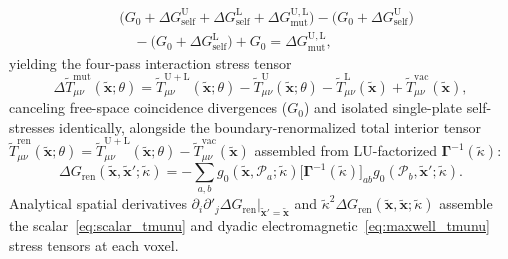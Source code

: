 \documentclass[aps,prd,twocolumn,10pt,showkeys,nofootinbib,floatfix,longbibliography]{revtex4-2}
\begin{document}
\begin{align*}
&\bigl(G_0 + \Delta G_{\mathrm{self}}^{\mathrm{U}} + \Delta G_{\mathrm{self}}^{\mathrm{L}} + \Delta G_{\mathrm{mut}}^{\mathrm{U,L}}\bigr) - \bigl(G_0 + \Delta G_{\mathrm{self}}^{\mathrm{U}}\bigr) \\
&\quad - \bigl(G_0 + \Delta G_{\mathrm{self}}^{\mathrm{L}}\bigr) + G_0 = \Delta G_{\mathrm{mut}}^{\mathrm{U,L}},
\end{align*}
yielding the four-pass interaction stress tensor
\begin{equation}
\Delta \tilde{T}_{\mu\nu}^{\mathrm{mut}}(\tilde{\mathbf{x}}; \theta) = \tilde{T}_{\mu\nu}^{\mathrm{U+L}}(\tilde{\mathbf{x}}; \theta) - \tilde{T}_{\mu\nu}^{\mathrm{U}}(\tilde{\mathbf{x}}; \theta) - \tilde{T}_{\mu\nu}^{\mathrm{L}}(\tilde{\mathbf{x}}) + \tilde{T}_{\mu\nu}^{\mathrm{vac}}(\tilde{\mathbf{x}}),
\label{eq:four_pass_correlator}
\end{equation}
canceling free-space coincidence divergences ($G_0$) and isolated single-plate self-stresses identically, alongside the boundary-renormalized total interior tensor $\tilde{T}_{\mu\nu}^{\mathrm{ren}}(\tilde{\mathbf{x}}; \theta) = \tilde{T}_{\mu\nu}^{\mathrm{U+L}}(\tilde{\mathbf{x}}; \theta) - \tilde{T}_{\mu\nu}^{\mathrm{vac}}(\tilde{\mathbf{x}})$ assembled from LU-factorized $\mathbf{\Gamma}^{-1}(\tilde{\kappa})$:
\begin{equation}
\Delta G_{\mathrm{ren}}(\tilde{\mathbf{x}}, \tilde{\mathbf{x}}'; \tilde{\kappa}) = -\sum_{a,b} g_0(\tilde{\mathbf{x}}, \mathcal{P}_a; \tilde{\kappa}) \bigl[\mathbf{\Gamma}^{-1}(\tilde{\kappa})\bigr]_{ab} g_0(\mathcal{P}_b, \tilde{\mathbf{x}}'; \tilde{\kappa}).
\label{eq:scattered_greens_pointwise}
\end{equation}
Analytical spatial derivatives $\partial_i \partial'_j \Delta G_{\mathrm{ren}}|_{\tilde{\mathbf{x}}'=\tilde{\mathbf{x}}}$ and $\tilde{\kappa}^2 \Delta G_{\mathrm{ren}}(\tilde{\mathbf{x}}, \tilde{\mathbf{x}}; \tilde{\kappa})$ assemble the scalar~\eqref{eq:scalar_tmunu} and dyadic electromagnetic~\eqref{eq:maxwell_tmunu} stress tensors at each voxel.
\end{document}
